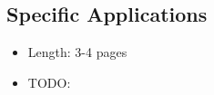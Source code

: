 \subsection{Specific Applications}


\begin{itemize}
  \item Length: 3-4 pages
  \item TODO:
\end{itemize}
